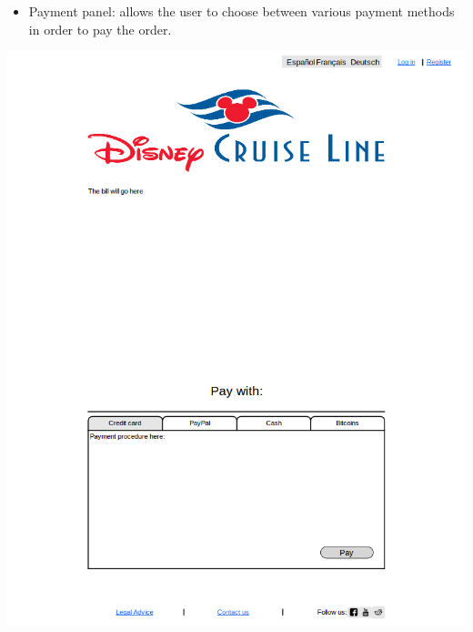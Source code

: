 \documentclass[11pt]{article}
\begin{document}
	\begin{qn}
		\begin{itemize}
			\item Payment panel: allows the user to choose between various payment methods in order to pay the order. 
		\end{itemize}
		\begin{center}
			\begin{minipage}{0.5\linewidth}
				\includegraphics[width=\linewidth]{images/mockup5.png}
				\label{fig:mockup5}
			\end{minipage}
		\end{center}
	\end{qn}
   
\end{document}
